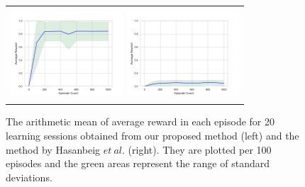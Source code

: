 \documentclass[letterpaper, 10 pt, conference]{ieeeconf}  %
\begin{document}
\begin{figure}[tbp]
 \centering
 \begin{tabular}{c}
  \begin{minipage}{0.5\hsize}
     \centering
     \includegraphics[bb=0 0 461 346, height = 3.4cm, width=4.2cm]{ep_1000_it_10000_MDP3_gamma_095_re2_ini22_nts_c095_20times.png}
 \end{minipage}

 \begin{minipage}{0.5\hsize}
   \centering
   \includegraphics[bb=0 0 461 346, height = 3.4cm, width=4.2cm]{ep_1000_it_10000_MDP3_gamma_095_nts_c095_abate_20times.png}
 \end{minipage}
\end{tabular}
 \caption{The arithmetic mean of average reward in each episode for 20 learning sessions obtained from our proposed method (left) and the method by Hasanbeig $et\ al.$\cite{HAK2019} (right). They are plotted per 100 episodes and the green areas represent the range of standard deviations.}
 \label{result}
\end{figure}
\end{document}

